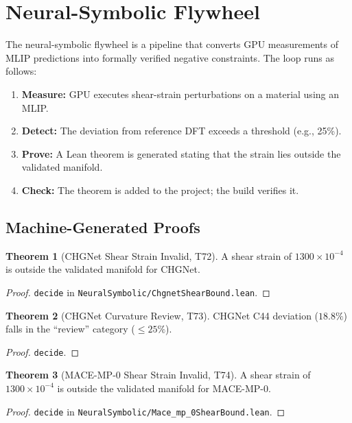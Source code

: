 \documentclass[11pt,a4paper]{article}
\theoremstyle{definition}
\newtheorem{theorem}{Theorem}[section]
\theoremstyle{plain}
\begin{document}
\section{Neural-Symbolic Flywheel}
\label{sec:flywheel}

The neural-symbolic flywheel is a pipeline that converts GPU measurements of MLIP predictions into formally verified negative constraints. The loop runs as follows:
\begin{enumerate}
\item \textbf{Measure:} GPU executes shear-strain perturbations on a material using an MLIP.
\item \textbf{Detect:} The deviation from reference DFT exceeds a threshold (e.g., 25\%).
\item \textbf{Prove:} A Lean theorem is generated stating that the strain lies outside the validated manifold.
\item \textbf{Check:} The theorem is added to the project; the build verifies it.
\end{enumerate}

\subsection{Machine-Generated Proofs}
\label{subsec:machine}

\begin{theorem}[CHGNet Shear Strain Invalid, T72]
\label{thm:chgnet}
A shear strain of $1300 \times 10^{-4}$ is outside the validated manifold for CHGNet.
\end{theorem}
\begin{proof}
\texttt{decide} in \texttt{NeuralSymbolic/ChgnetShearBound.lean}.
\end{proof}

\begin{theorem}[CHGNet Curvature Review, T73]
\label{thm:chgnetreview}
CHGNet C44 deviation ($18.8\%$) falls in the ``review'' category ($\leq 25\%$).
\end{theorem}
\begin{proof}
\texttt{decide}.
\end{proof}

\begin{theorem}[MACE-MP-0 Shear Strain Invalid, T74]
\label{thm:maceshear}
A shear strain of $1300 \times 10^{-4}$ is outside the validated manifold for MACE-MP-0.
\end{theorem}
\begin{proof}
\texttt{decide} in \texttt{NeuralSymbolic/Mace\_mp\_0ShearBound.lean}.
\end{proof}
\end{document}
